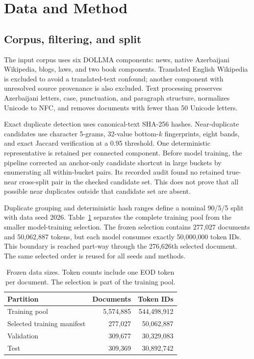 \documentclass[conference]{IEEEtran}
\begin{document}
\section{Data and Method}
\subsection{Corpus, filtering, and split}
The input corpus uses six DOLLMA components: news, native Azerbaijani Wikipedia, blogs, laws, and two book components. Translated English Wikipedia is excluded to avoid a translated-text confound; another component with unresolved source provenance is also excluded. Text processing preserves Azerbaijani letters, case, punctuation, and paragraph structure, normalizes Unicode to NFC, and removes documents with fewer than 50 Unicode letters.

Exact duplicate detection uses canonical-text SHA-256 hashes. Near-duplicate candidates use character 5-grams, 32-value bottom-$k$ fingerprints, eight bands, and exact Jaccard verification at a 0.95 threshold. One deterministic representative is retained per connected component. Before model training, the pipeline corrected an anchor-only candidate shortcut in large buckets by enumerating all within-bucket pairs. Its recorded audit found no retained true-near cross-split pair in the checked candidate set. This does not prove that all possible near duplicates outside that candidate set are absent.

Duplicate grouping and deterministic hash ranges define a nominal 90/5/5 split with data seed 2026. Table~\ref{tab:data} separates the complete training pool from the smaller model-training selection. The frozen selection contains 277,027 documents and 50,062,887 tokens, but each model consumes exactly 50,000,000 token IDs. This boundary is reached part-way through the 276,626th selected document. The same selected order is reused for all seeds and methods.

\begin{table}[t]
\caption{Frozen data sizes. Token counts include one EOD token per document. The selection is part of the training pool.}
\label{tab:data}
\centering\footnotesize
\begin{tabular}{lrr}
\toprule
Partition & Documents & Token IDs \\
\midrule
Training pool & 5,574,885 & 544,498,912 \\
Selected training manifest & 277,027 & 50,062,887 \\
Validation & 309,677 & 30,329,083 \\
Test & 309,369 & 30,892,742 \\
\bottomrule
\end{tabular}
\end{table}
\end{document}
